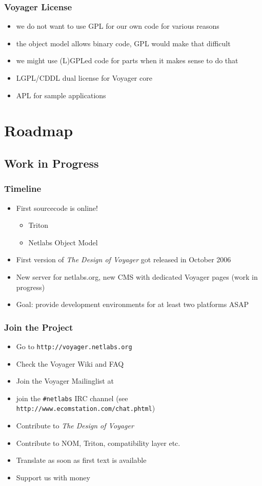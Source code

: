 \documentclass{beamer}
\begin{document}
\begin{frame}
\frametitle{Voyager License}
\begin{itemize}[<+->]
  \item we do not want to use GPL for our own code for various reasons
  \item the object model allows binary code, GPL would make that difficult
  \item we might use (L)GPLed code for parts when it makes sense to do that
  \item LGPL/CDDL dual license for Voyager core
  \item APL for sample applications
\end{itemize}
\end{frame}

\section{Roadmap}
\subsection{Work in Progress}

\begin{frame}
\frametitle{Timeline}
\begin{itemize}[<+->]
  \item First sourcecode is online!
  \begin{itemize}[<+->]
    \item Triton
    \item Netlabs Object Model
  \end{itemize}
  \item First version of \textit{The Design of Voyager} got released in October 2006
  \item New server for netlabs.org, new CMS with dedicated Voyager pages (work in progress)
  \item Goal: provide development environments for at least two platforms ASAP
\end{itemize}
\end{frame}

\begin{frame}
\frametitle{Join the Project}
\begin{itemize}[<+->]
  \item Go to \texttt{http://voyager.netlabs.org}
  \item Check the Voyager Wiki and FAQ
  \item Join the Voyager Mailinglist at
  \item join the \texttt{\#netlabs} IRC channel (see
  \texttt{http://www.ecomstation.com/chat.phtml}) 
  \item Contribute to \textit{The Design of Voyager}
  \item Contribute to NOM, Triton, compatibility layer etc.
  \item Translate as soon as first text is available
  \item Support us with money
\end{itemize}
\end{frame}
\end{document}
